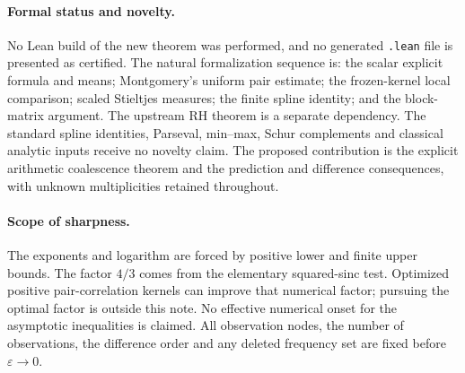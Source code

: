 \documentclass[11pt]{article}
\theoremstyle{definition}\newtheorem{definition}[theorem]{Definition}
\theoremstyle{remark}\newtheorem{remark}[theorem]{Remark}
\newcommand{\eps}{\varepsilon}
\begin{document}
\paragraph{Formal status and novelty.}
No Lean build of the new theorem was performed, and no generated
\texttt{.lean} file is presented as certified. The natural formalization
sequence is: the scalar explicit formula and means; Montgomery's
uniform pair estimate; the frozen-kernel local comparison; scaled
Stieltjes measures; the finite spline identity; and the block-matrix
argument. The upstream RH theorem is a separate dependency. The
standard spline identities, Parseval, min--max, Schur complements and
classical analytic inputs receive no novelty claim. The proposed
contribution is the explicit arithmetic coalescence theorem and the
prediction and difference consequences, with unknown multiplicities
retained throughout.

\paragraph{Scope of sharpness.}
The exponents and logarithm are forced by positive lower and finite
upper bounds. The factor $4/3$ comes from the elementary squared-sinc
test. Optimized positive pair-correlation kernels can improve that
numerical factor; pursuing the optimal factor is outside this note.
No effective numerical onset for the asymptotic inequalities is
claimed. All observation nodes, the number of observations, the
difference order and any deleted frequency set are fixed before
$\eps\to0$.
\end{document}
